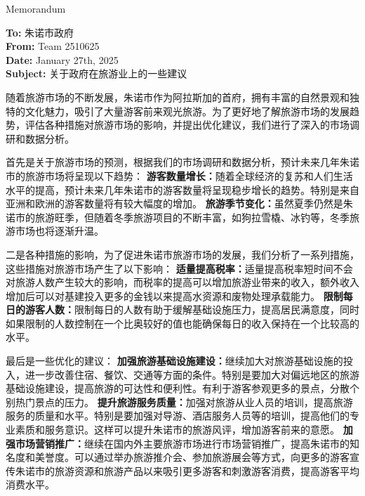 \documentclass[12pt]{article}  %
\begin{document}
\begin{letter}{Memorandum}
\begin{flushleft}  %
\textbf{To:} 朱诺市政府\\
\textbf{From:} Team 2510625\\
\textbf{Date:} January 27th, 2025\\
\textbf{Subject:} 关于政府在旅游业上的一些建议
\end{flushleft}

随着旅游市场的不断发展，朱诺市作为阿拉斯加的首府，拥有丰富的自然景观和独特的文化魅力，吸引了大量游客前来观光旅游。为了更好地了解旅游市场的发展趋势，评估各种措施对旅游市场的影响，并提出优化建议，我们进行了深入的市场调研和数据分析。

首先是关于旅游市场的预测，根据我们的市场调研和数据分析，预计未来几年朱诺市的旅游市场将呈现以下趋势：
\textbf{游客数量增长：}随着全球经济的复苏和人们生活水平的提高，预计未来几年朱诺市的游客数量将呈现稳步增长的趋势。特别是来自亚洲和欧洲的游客数量将有较大幅度的增加。
\textbf{旅游季节变化：}虽然夏季仍然是朱诺市的旅游旺季，但随着冬季旅游项目的不断丰富，如狗拉雪橇、冰钓等，冬季旅游市场也将逐渐升温。

二是各种措施的影响，为了促进朱诺市旅游市场的发展，我们分析了一系列措施，这些措施对旅游市场产生了以下影响：
\textbf{适量提高税率：}适量提高税率短时间不会对旅游人数产生较大的影响，而税率的提高可以增加旅游业带来的收入，额外收入增加后可以对基建投入更多的金钱以来提高水资源和废物处理承载能力。
\textbf{限制每日的游客人数：}限制每日的人数有助于缓解基础设施压力，提高居民满意度，同时如果限制的人数控制在一个比奥较好的值也能确保每日的收入保持在一个比较高的水平。

最后是一些优化的建议：
\textbf{加强旅游基础设施建设：}继续加大对旅游基础设施的投入，进一步改善住宿、餐饮、交通等方面的条件。特别是要加大对偏远地区的旅游基础设施建设，提高旅游的可达性和便利性。有利于游客参观更多的景点，分散个别热门景点的压力。
\textbf{提升旅游服务质量：}加强对旅游从业人员的培训，提高旅游服务的质量和水平。特别是要加强对导游、酒店服务人员等的培训，提高他们的专业素质和服务意识。这样可以提升朱诺市的旅游风评，增加游客前来的意愿。
\textbf{加强市场营销推广：}继续在国内外主要旅游市场进行市场营销推广，提高朱诺市的知名度和美誉度。可以通过举办旅游推介会、参加旅游展会等方式，向更多的游客宣传朱诺市的旅游资源和旅游产品以来吸引更多游客和刺激游客消费，提高游客平均消费水平。

\end{letter}
\clearpage
\end{document}
